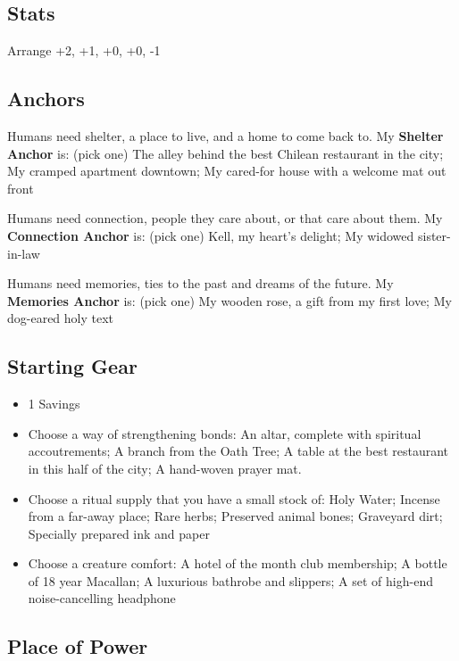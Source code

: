 \documentclass[
]{memoir}
\begin{document}
\hypertarget{stats-5}{%
\subsection{Stats}\label{stats-5}}

Arrange +2, +1, +0, +0, -1

\hypertarget{anchors-4}{%
\subsection{Anchors}\label{anchors-4}}

Humans need shelter, a place to live, and a home to come back to. My
\textbf{Shelter Anchor} is: (pick one) The alley behind the best Chilean
restaurant in the city; My cramped apartment downtown; My cared-for
house with a welcome mat out front

Humans need connection, people they care about, or that care about them.
My \textbf{Connection Anchor} is: (pick one) Kell, my heart's delight;
My widowed sister-in-law

Humans need memories, ties to the past and dreams of the future. My
\textbf{Memories Anchor} is: (pick one) My wooden rose, a gift from my
first love; My dog-eared holy text

\hypertarget{starting-gear-4}{%
\subsection{Starting Gear}\label{starting-gear-4}}

\begin{itemize}
\tightlist
\item
  1 Savings
\item
  Choose a way of strengthening bonds: An altar, complete with spiritual
  accoutrements; A branch from the Oath Tree; A table at the best
  restaurant in this half of the city; A hand-woven prayer mat.
\item
  Choose a ritual supply that you have a small stock of: Holy Water;
  Incense from a far-away place; Rare herbs; Preserved animal bones;
  Graveyard dirt; Specially prepared ink and paper
\item
  Choose a creature comfort: A hotel of the month club membership; A
  bottle of 18 year Macallan; A luxurious bathrobe and slippers; A set
  of high-end noise-cancelling headphone
\end{itemize}

\hypertarget{place-of-power-2}{%
\subsection{Place of Power}\label{place-of-power-2}}
\end{document}
